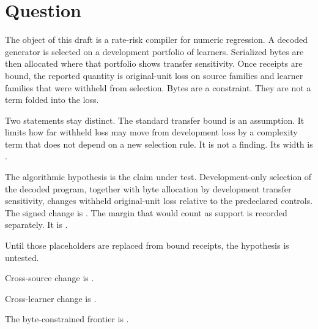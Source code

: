 \section{Question}
The object of this draft is a rate-risk compiler for numeric regression.
A decoded generator is selected on a development portfolio of learners.
Serialized bytes are then allocated where that portfolio shows transfer sensitivity.
Once receipts are bound, the reported quantity is original-unit loss on source families and learner families that were withheld from selection.
Bytes are a constraint.
They are not a term folded into the loss.

Two statements stay distinct.
The standard transfer bound is an assumption.
It limits how far withheld loss may move from development loss by a complexity term that does not depend on a new selection rule.
It is not a finding.
Its width is .

The algorithmic hypothesis is the claim under test.
Development-only selection of the decoded program, together with byte allocation by development transfer sensitivity, changes withheld original-unit loss relative to the predeclared controls.
The signed change is .
The margin that would count as support is recorded separately.
It is .

Until those placeholders are replaced from bound receipts, the hypothesis is untested.

Cross-source change is .

Cross-learner change is .

The byte-constrained frontier is .
